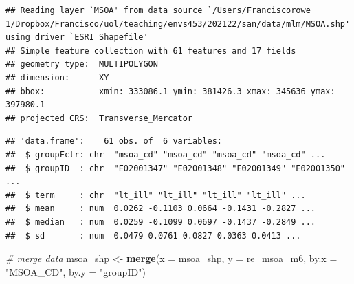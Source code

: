 \documentclass[
]{book}
\newenvironment{Shaded}{\begin{snugshade}}{\end{snugshade}}
\newcommand{\CommentTok}[1]{\textcolor[rgb]{0.56,0.35,0.01}{\textit{#1}}}
\newcommand{\DataTypeTok}[1]{\textcolor[rgb]{0.13,0.29,0.53}{#1}}
\newcommand{\KeywordTok}[1]{\textcolor[rgb]{0.13,0.29,0.53}{\textbf{#1}}}
\newcommand{\NormalTok}[1]{#1}
\newcommand{\OperatorTok}[1]{\textcolor[rgb]{0.81,0.36,0.00}{\textbf{#1}}}
\newcommand{\StringTok}[1]{\textcolor[rgb]{0.31,0.60,0.02}{#1}}
\begin{document}
\begin{verbatim}
## Reading layer `MSOA' from data source `/Users/Franciscorowe 1/Dropbox/Francisco/uol/teaching/envs453/202122/san/data/mlm/MSOA.shp' using driver `ESRI Shapefile'
## Simple feature collection with 61 features and 17 fields
## geometry type:  MULTIPOLYGON
## dimension:      XY
## bbox:           xmin: 333086.1 ymin: 381426.3 xmax: 345636 ymax: 397980.1
## projected CRS:  Transverse_Mercator
\end{verbatim}

\begin{Shaded}
\end{Shaded}

\begin{verbatim}
## 'data.frame':    61 obs. of  6 variables:
##  $ groupFctr: chr  "msoa_cd" "msoa_cd" "msoa_cd" "msoa_cd" ...
##  $ groupID  : chr  "E02001347" "E02001348" "E02001349" "E02001350" ...
##  $ term     : chr  "lt_ill" "lt_ill" "lt_ill" "lt_ill" ...
##  $ mean     : num  0.0262 -0.1103 0.0664 -0.1431 -0.2827 ...
##  $ median   : num  0.0259 -0.1099 0.0697 -0.1437 -0.2849 ...
##  $ sd       : num  0.0479 0.0761 0.0827 0.0363 0.0413 ...
\end{verbatim}

\begin{Shaded}
\begin{Highlighting}[]
\CommentTok{# merge data}
\NormalTok{msoa_shp <-}\StringTok{ }\KeywordTok{merge}\NormalTok{(}\DataTypeTok{x =}\NormalTok{ msoa_shp, }\DataTypeTok{y =}\NormalTok{ re_msoa_m6, }\DataTypeTok{by.x =} \StringTok{"MSOA_CD"}\NormalTok{, }\DataTypeTok{by.y =} \StringTok{"groupID"}\NormalTok{)}
\end{Highlighting}
\end{Shaded}
\end{document}
